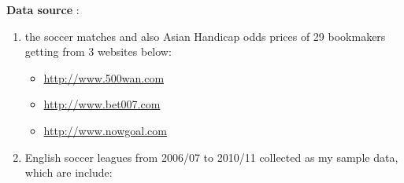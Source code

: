 \documentclass[article]{jss}
\providecommand{\tightlist}{%
  \setlength{\itemsep}{0pt}\setlength{\parskip}{0pt}}
\begin{document}
\textbf{Data source} : \bigbreak

\begin{enumerate}
\def\labelenumi{\arabic{enumi}.}
\tightlist
\item
  the soccer matches and also Asian Handicap odds prices of 29
  bookmakers getting from 3 websites below:

  \begin{itemize}
  \tightlist
  \item
    \url{http://www.500wan.com}
  \item
    \url{http://www.bet007.com}
  \item
    \url{http://www.nowgoal.com}
  \end{itemize}
\item
  English soccer leagues from 2006/07 to 2010/11 collected as my sample
  data, which are include:
\end{enumerate}
\end{document}
